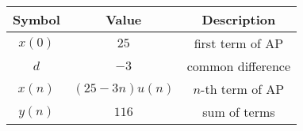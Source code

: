 \begin{tabular}{|c|c|c|}
	\hline
	\textbf{Symbol} & \textbf{Value} & \textbf{Description} \\[6pt]
	\hline
	$x(0)$ & $25$ & first term of AP \\[6pt]
	\hline
	$d$ & $-3$ & common difference \\[6pt]
	\hline
	$x(n)$ & $(25-3n)u(n)$ & $n$-th term of AP \\[6pt]
	\hline
	$y(n)$ & $116$ & sum of terms \\[6pt]
	\hline 
\end{tabular}
